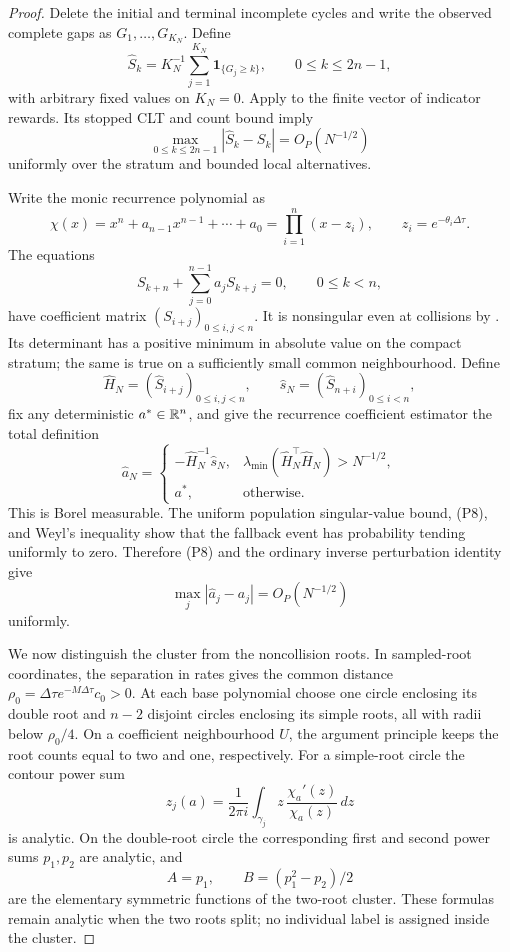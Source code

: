 \begin{proof}
Delete the initial and terminal incomplete cycles and write the observed
complete gaps as \(G_1,\ldots,G_{K_N}\).  Define
\[
 \widehat S_k=K_N^{-1}\sum_{j=1}^{K_N}\mathbf1_{\{G_j\ge k\}},
 \qquad 0\le k\le2n-1,
\tag{P7}
\]
with arbitrary fixed values on \(K_N=0\).  Apply
 to the finite vector of indicator
rewards.  Its stopped CLT and count bound imply
\[
 \max_{0\le k\le2n-1}|\widehat S_k-S_k|=O_P(N^{-1/2})
\tag{P8}
\]
uniformly over the stratum and bounded local alternatives.

Write the monic recurrence polynomial as
\[
 \chi(x)=x^n+a_{n-1}x^{n-1}+\cdots+a_0
 =\prod_{i=1}^n(x-z_i),\qquad z_i=e^{-\theta_i\Delta\tau}.
\tag{P9}
\]
The equations
\[
 S_{k+n}+\sum_{j=0}^{n-1}a_jS_{k+j}=0,\qquad0\le k<n,
\tag{P10}
\]
have coefficient matrix \((S_{i+j})_{0\le i,j<n}\).  It is nonsingular even
at collisions by
.  Its determinant
has a positive minimum in absolute value on the compact stratum; the same is
true on a sufficiently small common neighbourhood.  Define
\[
 \widehat H_N=(\widehat S_{i+j})_{0\le i,j<n},
 \qquad
 \widehat s_N=(\widehat S_{n+i})_{0\le i<n},
\]
fix any deterministic \(a^\ast\in\mathbb{R}^n\), and give the recurrence
coefficient estimator the total definition
\[
 \widehat a_N=
 \begin{cases}
 -\widehat H_N^{-1}\widehat s_N,
 &\lambda_{\min}(\widehat H_N^\top\widehat H_N)>N^{-1/2},\\
 a^\ast,&\text{otherwise}.
 \end{cases}
\tag{P10a}
\]
This is Borel measurable.  The uniform population singular-value bound,
\textup{(P8)}, and Weyl's inequality show that the fallback event has
probability tending uniformly to zero.  Therefore \textup{(P8)} and the
ordinary inverse perturbation identity give
\[
 \max_j|\widehat a_j-a_j|=O_P(N^{-1/2})
\tag{P11}
\]
uniformly.

We now distinguish the cluster from the noncollision roots.  In sampled-root
coordinates, the separation in rates gives the common distance
\(\rho_0=\Delta\tau e^{-M\Delta\tau}c_0>0\).  At each base polynomial choose
one circle enclosing its double root and \(n-2\) disjoint circles enclosing
its simple roots, all with radii below \(\rho_0/4\).  On a coefficient
neighbourhood \(U\), the argument principle keeps the root counts equal to
two and one, respectively.  For a simple-root circle the contour power sum
\[
 z_j(a)=\frac{1}{2\pi i}\int_{\gamma_j}
 z\,\frac{\chi_a'(z)}{\chi_a(z)}\,dz
\tag{P12}
\]
is analytic.  On the double-root circle the corresponding first and second
power sums \(p_1,p_2\) are analytic, and
\[
 A=p_1,\qquad B=(p_1^2-p_2)/2
\tag{P13}
\]
are the elementary symmetric functions of the two-root cluster.  These
formulas remain analytic when the two roots split; no individual label is
assigned inside the cluster.


\end{proof}
